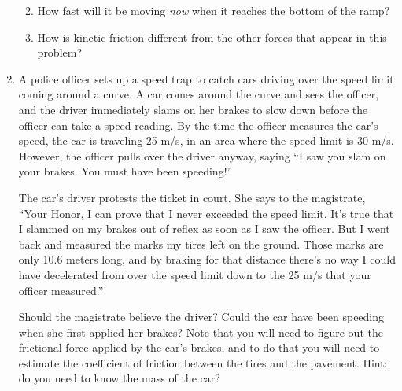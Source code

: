 \documentclass[12pt]{article}
\begin{document}
\begin{enumerate}
\begin{enumerate}
\vspace{2in}


\item How fast will it be moving {\it now} when it reaches the bottom of the ramp? 

\vspace{2.7in}

\item How is kinetic friction different from the other forces that appear in this problem?


	
	

\end{enumerate}

\newpage



\item{A police officer sets up a speed trap to catch cars driving over the speed limit coming around a curve. A car comes around the curve and sees the officer, and the driver immediately slams on her brakes to slow down before the officer can take a speed reading. 
	By the time the officer measures the car's speed, the car is traveling 25 m/s, in an area where the speed limit is 30 m/s. However, the officer pulls over the driver anyway, saying ``I saw you slam on your brakes. You must have been speeding!''
	
	The car's driver protests the ticket in court. She says to the magistrate, ``Your Honor, I can prove that I never exceeded the speed limit. It's true that I slammed on my brakes out of reflex as soon as I saw the officer. But I went back and measured the marks
	my tires left on the ground. Those marks are only 10.6 meters long, and by braking for that distance there's no way I could have decelerated from over the speed limit down to the 25 m/s that your officer measured.''
	
	Should the magistrate believe the driver? Could the car have been speeding when she first applied her brakes? Note that you will need to figure out the frictional force applied by the car's brakes, and to do that you will need to estimate the coefficient of 
	friction between the tires and the pavement. Hint: do you need to know the mass of the car?}
\end{enumerate}
\end{document}
